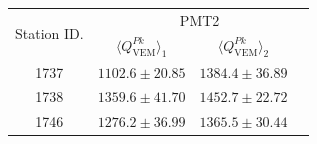 \documentclass[aspectratio=169]{beamer}
\begin{document}
\begin{frame}
  \footnotesize
  \begin{tabular}{c|c|c|c} \hline
    \multirow{2}{*}{Station ID.} & \multicolumn{3}{c}{PMT2} \\
    \cline{2-4}
    & $\langle Q^{Pk}_{\mathrm{VEM}} \rangle_1$ &
    $\langle Q^{Pk}_{\mathrm{VEM}} \rangle_2$ &  \\
    \cline{1-4}
    1737 & $1102.6\pm20.85$ & $1384.4\pm36.89$ &
    \\ \hline
    1738 & $1359.6\pm41.70$ & $1452.7\pm22.72$ &
    \\ \hline
    1746 & $1276.2\pm36.99$ & $1365.5\pm30.44$ &
    \\ \hline

  \end{tabular}
\end{frame}
\end{document}
